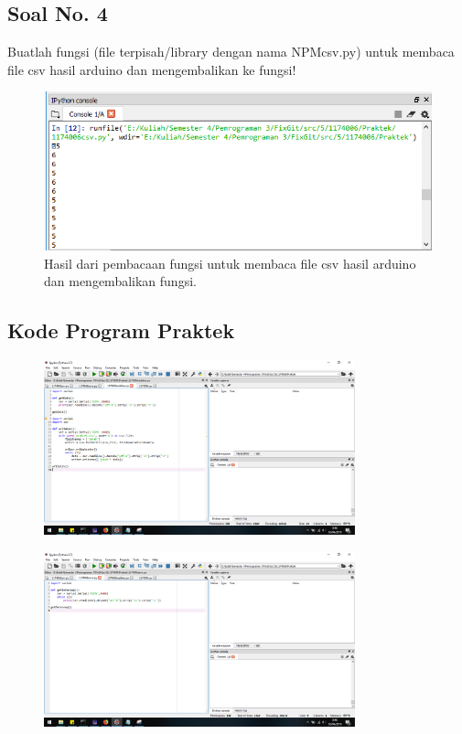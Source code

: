 \subsection{Soal No. 4}
Buatlah fungsi (file terpisah/library dengan nama NPMcsv.py) untuk membaca file csv hasil arduino dan mengembalikan ke fungsi!


\begin{figure}[H]
	\includegraphics[width=12cm]{figures/5/1174017/Praktek/4.png}
	\centering
	\caption{Hasil dari pembacaan fungsi untuk membaca file csv hasil arduino dan mengembalikan fungsi.}
\end{figure}

\subsection{Kode Program Praktek}
\begin{figure}[H]
	\includegraphics[width=9cm]{figures/5/1174017/Praktek/realtime.png}
	\centering
\end{figure}

\begin{figure}[H]
	\includegraphics[width=9cm]{figures/5/1174017/Praktek/save.png}
	\centering
\end{figure}

